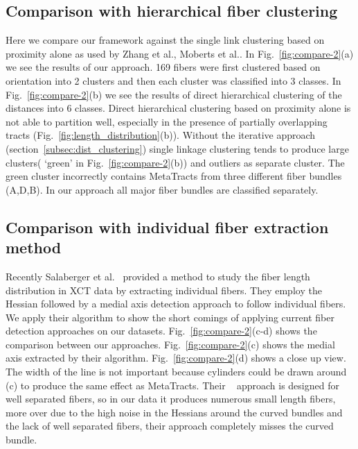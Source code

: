 \subsection {Comparison with hierarchical fiber clustering}
\label{subsec:compare}
Here we compare our framework against the single link clustering based on proximity alone as used by Zhang et al.\cite{Zhang2008}, Moberts et al.\cite{Moberts2005}. In Fig.~\ref{fig:compare-2}(a) we see the results of our approach. 169 fibers were first clustered based on orientation into 2 clusters and then each cluster was classified into 3 classes. In Fig.~\ref{fig:compare-2}(b) we see the results of direct hierarchical clustering of the distances into 6 classes. Direct hierarchical clustering based on proximity alone is not able to partition well, especially in the presence of partially overlapping tracts (Fig.~\ref{fig:length_distribution}(b)). Without the iterative approach (section~\ref{subsec:dist_clustering}) single linkage clustering tends to produce large clusters( `green' in Fig.~\ref{fig:compare-2}(b)) and outliers as separate cluster. The green cluster incorrectly contains MetaTracts from three different fiber bundles (A,D,B). In our approach all major fiber bundles are classified separately.

\subsection{Comparison with individual fiber extraction method}
 Recently  Salaberger et al.~\cite{Salaberger2011} provided a method to study the fiber length distribution in XCT data by extracting individual fibers. They employ the Hessian followed by a medial axis detection approach to follow  individual fibers. We apply their algorithm to show the short comings of applying current fiber detection approaches on our datasets. Fig.~\ref{fig:compare-2}(c-d) shows the comparison between our approaches. Fig.~\ref{fig:compare-2}(c) shows the medial axis extracted by their algorithm. Fig.~\ref{fig:compare-2}(d) shows a close up view. The width of the line is not important because cylinders could be drawn around (c) to produce the same effect as MetaTracts. Their ~\cite{Salaberger2011} approach is designed for well separated fibers, so in our data it produces numerous small length fibers, more over due to the high noise in the Hessians around the curved bundles and the lack of well separated fibers, their approach completely misses the curved bundle.
 






